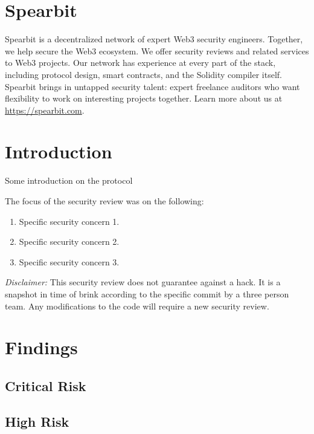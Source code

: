 \section{Spearbit}\label{spearbit}

Spearbit is a decentralized network of expert Web3 security engineers.
Together, we help secure the Web3 ecosystem. We offer security reviews
and related services to Web3 projects. Our network has experience at
every part of the stack, including protocol design, smart contracts, and
the Solidity compiler itself. Spearbit brings in untapped security
talent: expert freelance auditors who want flexibility to work on
interesting projects together. Learn more about us at
\url{https://spearbit.com}.

\section{Introduction}\label{introduction}

Some introduction on the protocol

The focus of the security review was on the following:

\begin{enumerate}
\def\labelenumi{\arabic{enumi}.}
\tightlist
\item
  Specific security concern 1.
\item
  Specific security concern 2.
\item
  Specific security concern 3.
\end{enumerate}

\emph{Disclaimer:} This security review does not guarantee against a
hack. It is a snapshot in time of brink according to the specific commit
by a three person team. Any modifications to the code will require a new
security review.

\section{Findings}\label{findings}

\subsection{Critical Risk}\label{critical-risk}

\subsection{High Risk}\label{high-risk}

